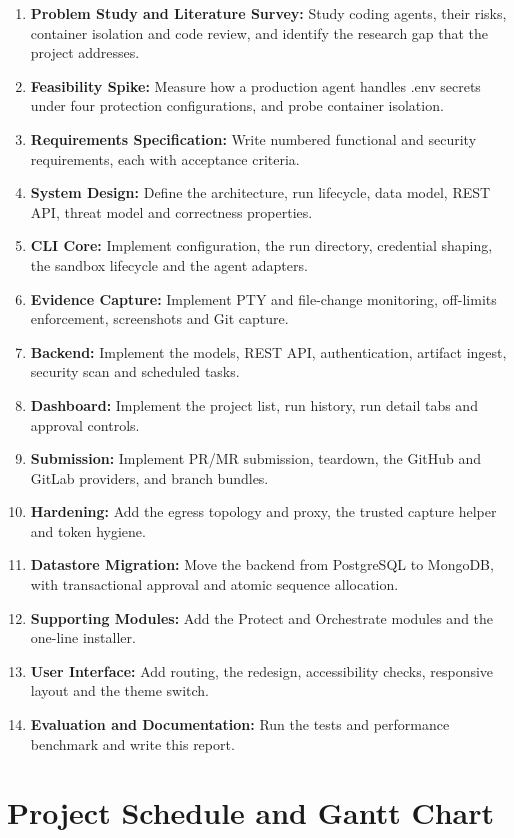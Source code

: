 \documentclass[12pt,a4paper,oneside]{report}
\begin{document}
\begin{enumerate}
\item
  \textbf{Problem Study and Literature Survey:} Study coding agents, their risks, container isolation and code review, and identify the research gap that the project addresses.
\item
  \textbf{Feasibility Spike:} Measure how a production agent handles .env secrets under four protection configurations, and probe container isolation.
\item
  \textbf{Requirements Specification:} Write numbered functional and security requirements, each with acceptance criteria.
\item
  \textbf{System Design:} Define the architecture, run lifecycle, data model, REST API, threat model and correctness properties.
\item
  \textbf{CLI Core:} Implement configuration, the run directory, credential shaping, the sandbox lifecycle and the agent adapters.
\item
  \textbf{Evidence Capture:} Implement PTY and file-change monitoring, off-limits enforcement, screenshots and Git capture.
\item
  \textbf{Backend:} Implement the models, REST API, authentication, artifact ingest, security scan and scheduled tasks.
\item
  \textbf{Dashboard:} Implement the project list, run history, run detail tabs and approval controls.
\item
  \textbf{Submission:} Implement PR/MR submission, teardown, the GitHub and GitLab providers, and branch bundles.
\item
  \textbf{Hardening:} Add the egress topology and proxy, the trusted capture helper and token hygiene.
\item
  \textbf{Datastore Migration:} Move the backend from PostgreSQL to MongoDB, with transactional approval and atomic sequence allocation.
\item
  \textbf{Supporting Modules:} Add the Protect and Orchestrate modules and the one-line installer.
\item
  \textbf{User Interface:} Add routing, the redesign, accessibility checks, responsive layout and the theme switch.
\item
  \textbf{Evaluation and Documentation:} Run the tests and performance benchmark and write this report.
\end{enumerate}

\section{Project Schedule and Gantt Chart}\label{project-schedule}
\end{document}
